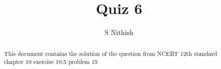 \documentclass[journal,12pt,twocolumn]{IEEEtran}
\begin{document}
\let\StandardTheFigure\thefigure
\let\vec\mathbf
\renewcommand{\thefigure}{\theproblem}



\def\putbox#1#2#3{\makebox[0in][l]{\makebox[#1][l]{}\raisebox{\baselineskip}[0in][0in]{\raisebox{#2}[0in][0in]{#3}}}}
     \def\rightbox#1{\makebox[0in][r]{#1}}
     \def\centbox#1{\makebox[0in]{#1}}
     \def\topbox#1{\raisebox{-\baselineskip}[0in][0in]{#1}}
     \def\midbox#1{\raisebox{-0.5\baselineskip}[0in][0in]{#1}}

\vspace{3cm}


\title{Quiz 6}
\author{S Nithish}





\maketitle

\newpage


\bigskip

\renewcommand{\thefigure}{\theenumi}
\renewcommand{\thetable}{\theenumi}


\begin{abstract}
This document contains the solution of the question from NCERT 12th standard chapter 10 exercise 10.5 problem 15
\end{abstract}

%

%
%
\end{document}
